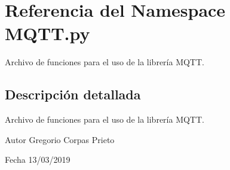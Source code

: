 \hypertarget{namespaceMQTT_1_1py}{}\section{Referencia del Namespace M\+Q\+T\+T.\+py}
\label{namespaceMQTT_1_1py}


Archivo de funciones para el uso de la librería M\+Q\+TT.  




\subsection{Descripción detallada}
Archivo de funciones para el uso de la librería M\+Q\+TT. 

\begin{DoxyAuthor}{Autor}
Gregorio Corpas Prieto 
\end{DoxyAuthor}
\begin{DoxyDate}{Fecha}
13/03/2019 
\end{DoxyDate}
